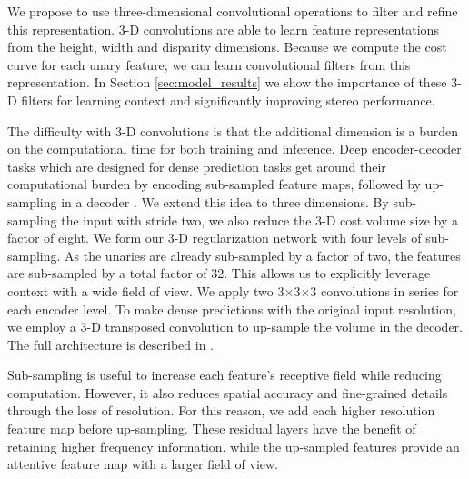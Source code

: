 We propose to use three-dimensional convolutional operations to filter and refine this representation. 3-D convolutions are able to learn feature representations from the height, width and disparity dimensions. Because we compute the cost curve for each unary feature, we can learn convolutional filters from this representation. In Section \ref{sec:model_results} we show the importance of these 3-D filters for learning context and significantly improving stereo performance.


The difficulty with 3-D convolutions is that the additional dimension is a burden on the computational time for both training and inference. Deep encoder-decoder tasks which are designed for dense prediction tasks get around their computational burden by encoding sub-sampled feature maps, followed by up-sampling in a decoder \citep{badrinarayanan2017segnet}. We extend this idea to three dimensions. By sub-sampling the input with stride two, we also reduce the 3-D cost volume size by a factor of eight. We form our 3-D regularization network with four levels of sub-sampling. As the unaries are already sub-sampled by a factor of two, the features are sub-sampled by a total factor of 32. This allows us to explicitly leverage context with a wide field of view. We apply two 3$\times$3$\times$3 convolutions in series for each encoder level. To make dense predictions with the original input resolution, we employ a 3-D transposed convolution to up-sample the volume in the decoder. The full architecture is described in .

Sub-sampling is useful to increase each feature's receptive field while reducing computation. However, it also reduces spatial accuracy and fine-grained details through the loss of resolution. For this reason, we add each higher resolution feature map before up-sampling. These residual layers have the benefit of retaining higher frequency information, while the up-sampled features provide an attentive feature map with a larger field of view.

